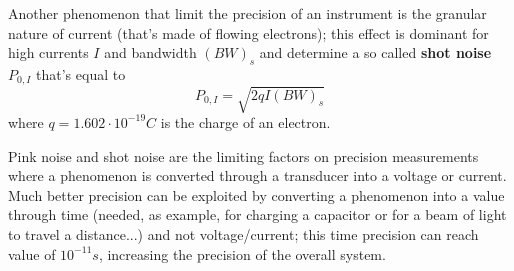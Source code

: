 		Another phenomenon that limit the precision of an instrument is the granular nature of current (that's made of flowing electrons); this effect is dominant for high currents $I$ and bandwidth $(BW)_s$ and determine a so called \textbf{shot noise} $P_{0,I}$ that's equal to		
		\[ P_{0,I} = \sqrt{2qI (BW)_s}\]
		where $q = 1.602\cdot 10^{-19} C$ is the charge of an electron.		
		\vspace{3mm}
		
		Pink noise and shot noise are the limiting factors on precision measurements where a phenomenon is converted through a transducer into a voltage or current. Much better precision can be exploited by converting a phenomenon into a value through time (needed, as example, for charging a capacitor or for a beam of light to travel a distance...) and not voltage/current; this time precision can reach value of $10^{-11} s$, increasing the precision of the overall system.
	
	
	
	
	
	
	
	
	
	
	
	
	
	
	
	
	
	
